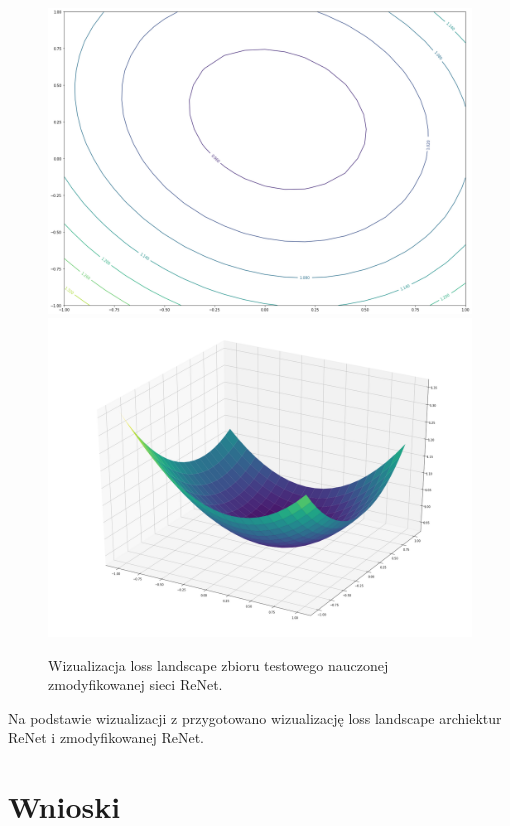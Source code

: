 \documentclass[oneside, mag]{mgr}
\begin{document}
\begin{figure}
\centering
	\includegraphics[width=1.0\textwidth]{img/loss_modif_ReNet.png}
	\includegraphics[width=1.0\textwidth]{img/loss_3d_modif_ReNet.png}
	\caption{Wizualizacja loss landscape zbioru testowego nauczonej zmodyfikowanej sieci ReNet.}
	\label{fig:loss_modif_ReNet}
\end{figure}

Na podstawie wizualizacji z \cite{DBLP:journals/corr/abs-1712-09913} przygotowano wizualizację loss landscape archiektur ReNet i zmodyfikowanej ReNet.

\chapter{Wnioski}
\end{document}
